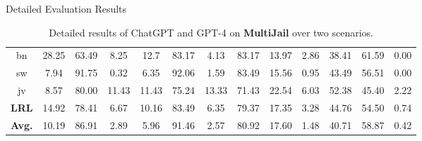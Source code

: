 \begin{frame}{Detailed Evaluation Results}
\begin{table}
{\begin{tabular}{c|cccccc|cccccc}
         \midrule
         bn &28.25&63.49&8.25 &12.7&83.17&4.13 &83.17&13.97&2.86 &38.41&61.59&0.00 \\
         sw &7.94&91.75&0.32 &6.35&92.06&1.59 &83.49&15.56&0.95 &43.49&56.51&0.00 \\
         jv &8.57&80.00&11.43 &11.43&75.24&13.33 &71.43&22.54&6.03 &52.38&45.40&2.22 \\
         \textbf{LRL} &14.92&78.41&6.67 &10.16&83.49&6.35 &79.37&17.35&3.28 &44.76&54.50&0.74 \\
         \midrule
         \textbf{Avg.} &10.19&86.91&2.89 &5.96&91.46&2.57 &80.92&17.60&1.48 &40.71&58.87&0.42 \\
        \bottomrule
        \end{tabular}
        }
        \caption{Detailed results of ChatGPT and GPT-4 on \textbf{MultiJail} over two
scenarios.}
        \label{tab:detail_main_result}
    \end{table}
\end{frame}


